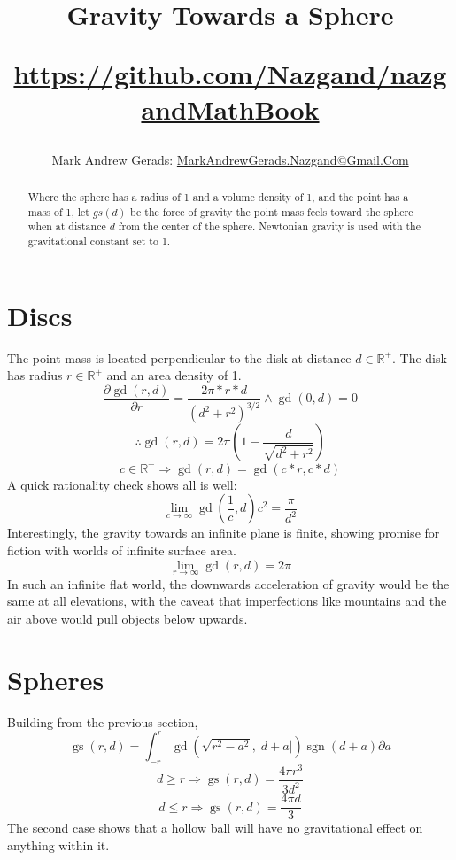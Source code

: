 \documentclass[]{article}
\author{Mark Andrew Gerads: \href{MailTo:MarkAndrewGerads.Nazgand@Gmail.Com}{MarkAndrewGerads.Nazgand@Gmail.Com}}
\title{
	Gravity Towards a Sphere
	
	\href{https://github.com/Nazgand/nazgandMathBook}{https://github.com/Nazgand/nazgandMathBook}
}
\DeclareMathOperator{\sgn}{sgn}
\DeclareMathOperator{\gd}{gd}
\DeclareMathOperator{\gs}{gs}
\begin{document}
\maketitle

\begin{abstract}
Where the sphere has a radius of 1 and a volume density of 1, and the point has a mass of 1, let \(gs\left(d\right)\) be the force of gravity the point mass feels toward the sphere when at distance \(d\) from the center of the sphere. Newtonian gravity is used with the gravitational constant set to 1.
\end{abstract}

\section{Discs}
The point mass is located perpendicular to the disk at distance \(d\in\mathbb{R}^+\). The disk has radius \(r\in\mathbb{R}^+\) and an area density of 1.
\[\frac{\partial \gd\left(r,d\right)}{\partial r}=\frac{2\pi*r*d}{\left(d^2+r^2\right)^{3/2}}\land \gd\left(0,d\right)=0\]
\[\therefore \gd\left(r,d\right)=2\pi\left(1-\frac{d}{\sqrt{d^2+r^2}}\right)\]
\[c\in\mathbb{R}^+\Rightarrow \gd\left(r,d\right)=\gd\left(c*r,c*d\right)\]
A quick rationality check shows all is well:
\[\lim_{c\rightarrow\infty}\gd\left(\frac{1}{c},d\right)c^2=\frac{\pi}{d^2}\]
Interestingly, the gravity towards an infinite plane is finite, showing promise for fiction with worlds of infinite surface area.
\[\lim_{r\rightarrow\infty}\gd\left(r,d\right)=2\pi\]
In such an infinite flat world, the downwards acceleration of gravity would be the same at all elevations, with the caveat that imperfections like mountains and the air above would pull objects below upwards.
\section{Spheres}
Building from the previous section,
\[\gs\left(r,d\right)=\int_{-r}^{r}\gd\left(\sqrt{r^2-a^2},\left|d+a\right|\right)\sgn\left(d+a\right)\partial a\]
\[d\geq r\Rightarrow\gs\left(r,d\right)=\frac{4\pi r^3}{3d^2}\]
\[d\leq r\Rightarrow\gs\left(r,d\right)=\frac{4\pi d}{3}\]
The second case shows that a hollow ball will have no gravitational effect on anything within it.
\end{document}
